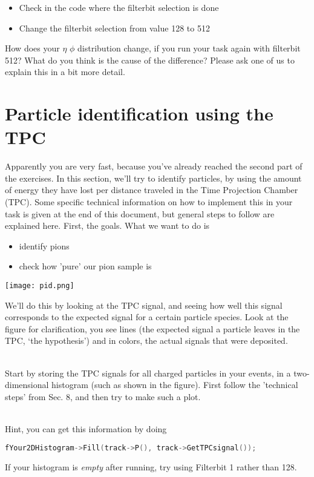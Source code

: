 \documentclass{article}
\begin{document}
\begin{itemize}
    \item Check in the code where the filterbit selection is done
    \item Change the filterbit selection from value 128 to 512
\end{itemize}
How does your $\eta$ $\phi$ distribution change, if you run your task again with filterbit 512? What do you think is the cause of the difference? Please ask one of us to explain this in a bit more detail. 



\section{Particle identification using the TPC}

Apparently you are very fast, because you've already reached the second part of the exercises. In this section, we'll try to identify particles, by using the amount of energy they have lost per distance traveled in the Time Projection Chamber (TPC). Some specific technical information on how to implement this in your task is given at the end of this document, but general steps to follow are explained here. First, the goals. What we want to do is
\begin{itemize}
\item identify pions
\item check how 'pure' our pion sample is
\end{itemize}

\texttt{[image: pid.png]}


We'll do this by looking at the TPC signal, and seeing how well this signal corresponds to the expected signal for a certain particle species. Look at the figure for clarification, you see lines (the expected signal a particle leaves in the TPC, `the hypothesis') and in colors, the actual signals that were deposited.


\\


Start by storing the TPC signals for all charged particles in your events, in a two-dimensional histogram (such as shown in the figure). First follow the 'technical steps' from Sec. 8, and then try to make such a plot. 

\\


Hint, you can get this information by doing
\begin{lstlisting}[language=C,number=left]
fYour2DHistogram->Fill(track->P(), track->GetTPCsignal());\end{lstlisting}
If your histogram is \emph{empty} after running, try using Filterbit 1 rather than 128.
\end{document}
